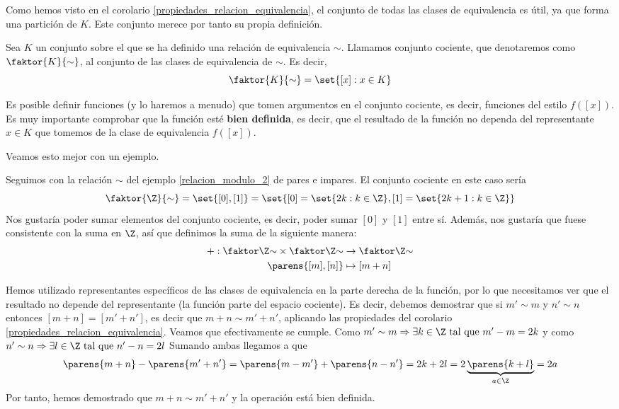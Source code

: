 \documentclass[../algebra_lineal.tex]{subfiles}
\begin{document}
Como hemos visto en el corolario \ref{propiedades_relacion_equivalencia}, el conjunto de todas las clases de equivalencia es útil, ya que forma una partición de $K$. Este conjunto merece por tanto su propia definición.
\begin{definition}
    Sea $K$ un conjunto sobre el que se ha definido una relación de equivalencia $\sim$. Llamamos conjunto cociente, que denotaremos como $\faktor{K}{\sim}$, al conjunto de las clases de equivalencia de $\sim$. Es decir,
    \[
        \faktor{K}{\sim} = \set{[x] : x \in K}
    \]
\end{definition}

\begin{remark}
    Es posible definir funciones (y lo haremos a menudo) que tomen argumentos en el conjunto cociente, es decir, funciones del estilo $f([x])$. Es muy importante comprobar que la función esté \textbf{bien definida}, es decir, que el resultado de la función no dependa del representante $x \in K$ que tomemos de la clase de equivalencia $f([x])$.  
\end{remark}

Veamos esto mejor con un ejemplo.

\begin{example}
    \label{ejemplo_buena_definicion}
    Seguimos con la relación $\sim$ del ejemplo \ref{relacion_modulo_2} de pares e impares. El conjunto cociente en este caso sería
    \[
        \faktor{\Z}{\sim} = \set{[0], [1]} = \set{ [0] = \set{2k : k \in \Z}, [1] = \set{2k+1 : k \in \Z} }
    \]
    Nos gustaría poder sumar elementos del conjunto cociente, es decir, poder sumar $[0]$ y $[1]$ entre sí. Además, nos gustaría que fuese consistente con la suma en $\Z$, así que definimos la suma de la siguiente manera:
    \begin{align*}
        + :  \qs{\Z} \times \qs{\Z} &\to \qs{\Z} \\
          \parens{[m], [n]} &\mapsto [m + n]
    \end{align*}

    Hemos utilizado representantes específicos de las clases de equivalencia en la parte derecha de la función, por lo que necesitamos ver que el resultado no depende del representante (la función parte del espacio cociente). Es decir, debemos demostrar que si $m' \sim m$ y $n' \sim n$ entonces $[m+n]=[m'+n']$, es decir que $m+n \sim m' + n'$, aplicando las propiedades del corolario \ref{propiedades_relacion_equivalencia}. 
    Veamos que efectivamente se cumple. Como $m' \sim m \Rightarrow \exists k \in \Z \st m' - m = 2k$ y como $n' \sim n \Rightarrow \exists l \in \Z \st n' - n = 2l$ Sumando ambas llegamos a que 
    \[
        \parens{m+n} - \parens{m'+n'} = \parens{m-m'} + \parens{n-n'} = 2k + 2l = 2\underbrace{\parens{k+l}}_{a \in \Z} = 2a  
    \]
    Por tanto, hemos demostrado que $m+n \sim m'+n'$ y la operación está bien definida. 
\end{example}
\end{document}
